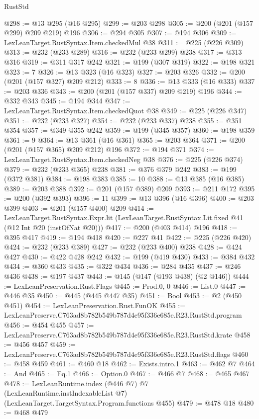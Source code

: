\begin{lexlean}{RustStd}
\begin{coremodule}
@298 := @13 @295 (@16 @295)
@299 := @203 @298
@305 := @200 (@201 (@157 @299) @209 @219) @196
@306 := @294 @305
@307 := @194 @306
@309 := LexLeanTarget.RustSyntax.Item.checkedMul @38
@311 := @225 (@226 @309)
@313 := @232 (@233 @289)
@316 := @232 (@233 @299) @238
@317 := @313 @316
@319 := @311 @317 @242
@321 := @199 (@307 @319)
@322 := @198 @321
@323 := 7
@326 := @13 @323 (@16 @323)
@327 := @203 @326
@332 := @200 (@201 (@157 @327) @209 @212)
@333 := 8
@336 := @13 @333 (@16 @333)
@337 := @203 @336
@343 := @200 (@201 (@157 @337) @209 @219) @196
@344 := @332 @343
@345 := @194 @344
@347 := LexLeanTarget.RustSyntax.Item.checkedQuot @38
@349 := @225 (@226 @347)
@351 := @232 (@233 @327)
@354 := @232 (@233 @337) @238
@355 := @351 @354
@357 := @349 @355 @242
@359 := @199 (@345 @357)
@360 := @198 @359
@361 := 9
@364 := @13 @361 (@16 @361)
@365 := @203 @364
@371 := @200 (@201 (@157 @365) @209 @212) @196
@372 := @194 @371
@374 := LexLeanTarget.RustSyntax.Item.checkedNeg @38
@376 := @225 (@226 @374)
@379 := @232 (@233 @365) @238
@381 := @376 @379 @242
@383 := @199 (@372 @381)
@384 := @198 @383
@385 := 10
@388 := @13 @385 (@16 @385)
@389 := @203 @388
@392 := @201 (@157 @389) @209
@393 := @211 @172
@395 := @200 (@392 @393)
@396 := 11
@399 := @13 @396 (@16 @396)
@400 := @203 @399
@403 := @201 (@157 @400) @209
@414 := LexLeanTarget.RustSyntax.Expr.lit
    (LexLeanTarget.RustSyntax.Lit.fixed @41 (@12 Int @20 (instOfNat @20)))
@417 := @200 (@403 @414) @196
@418 := @395 @417
@419 := @194 @418
@420 := @227 @41
@422 := @225 (@226 @420)
@424 := @232 (@233 @389)
@427 := @232 (@233 @400) @238
@428 := @424 @427
@430 := @422 @428 @242
@432 := @199 (@419 @430)
@433 := @384 @432
@434 := @360 @433
@435 := @322 @434
@436 := @284 @435
@437 := @246 @436
@438 := @197 @437
@443 := @145 (@147 (@193 @438) (@2 @146))
@444 := LexLeanPreservation.Rust.Flags
@445 := Prod.{0, 0}
@446 := List.{0}
@447 := @446 @35
@450 := @445 (@445 @447 @35)
@451 := Bool
@453 := @2 (@450 @451)
@454 := LexLeanPreservation.Rust.FunOK
@455 := LexLeanPreserve.C763ad8b782b549b787d4e95f336e685e.R23.RustStd.program
@456 := @454 @455
@457 := LexLeanPreserve.C763ad8b782b549b787d4e95f336e685e.R23.RustStd.krate
@458 := @456 @457
@459 := LexLeanPreserve.C763ad8b782b549b787d4e95f336e685e.R23.RustStd.flags
@460 := @458 @459
@461 := @460 @18
@462 := Exists.intro.{1}
@463 := @462 @7
@464 := And
@465 := Eq.{1}
@466 := Option.{0}
@467 := @466 @7
@468 := @465 @467
@478 := LexLeanRuntime.index
    (@446 @7)
    @7
    (LexLeanRuntime.instIndexableList @7)
    (LexLeanTarget.TargetSyntax.Program.functions @455)
@479 := @478 @18
@480 := @468 @479

\end{coremodule}
\end{lexlean}
